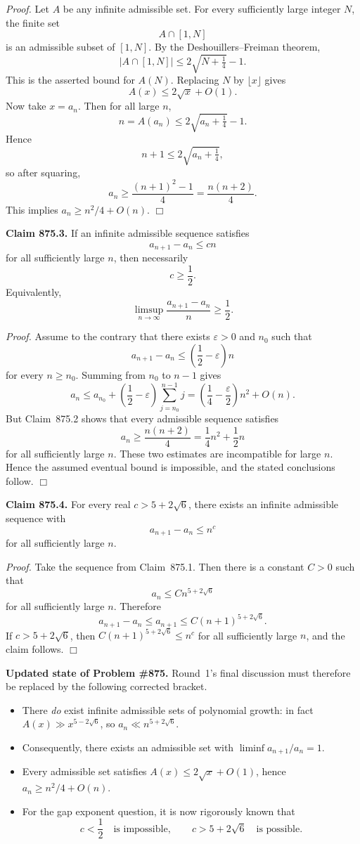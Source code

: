 \medskip
\noindent\emph{Proof.}
Let \(A\) be any infinite admissible set. For every sufficiently large integer \(N\), the finite set
\[
  A\cap [1,N]
\]
is an admissible subset of \([1,N]\). By the Deshouillers--Freiman theorem,
\[
  |A\cap [1,N]| \le 2\sqrt{N+\tfrac14}-1.
\]
This is the asserted bound for \(A(N)\). Replacing \(N\) by \(\lfloor x\rfloor\) gives
\[
  A(x) \le 2\sqrt x + O(1).
\]
Now take \(x=a_n\). Then for all large \(n\),
\[
  n = A(a_n) \le 2\sqrt{a_n+\tfrac14}-1.
\]
Hence
\[
  n+1 \le 2\sqrt{a_n+\tfrac14},
\]
so after squaring,
\[
  a_n \ge \frac{(n+1)^2-1}{4} = \frac{n(n+2)}{4}.
\]
This implies \(a_n\ge n^2/4 + O(n)\).
\hfill\(\Box\)

\medskip
\noindent\textbf{Claim 875.3.} If an infinite admissible sequence satisfies
\[
  a_{n+1}-a_n \le c n
\]
for all sufficiently large \(n\), then necessarily
\[
  c\ge \frac12.
\]
Equivalently,
\[
  \limsup_{n\to\infty}\frac{a_{n+1}-a_n}{n} \ge \frac12.
\]

\medskip
\noindent\emph{Proof.}
Assume to the contrary that there exists \(\varepsilon>0\) and \(n_0\) such that
\[
  a_{n+1}-a_n \le \left(\frac12-\varepsilon\right)n
\]
for every \(n\ge n_0\). Summing from \(n_0\) to \(n-1\) gives
\[
  a_n \le a_{n_0} + \left(\frac12-\varepsilon\right)\sum_{j=n_0}^{n-1} j
  = \left(\frac14-\frac{\varepsilon}{2}\right)n^2 + O(n).
\]
But Claim~875.2 shows that every admissible sequence satisfies
\[
  a_n \ge \frac{n(n+2)}{4} = \frac14 n^2 + \frac12 n
\]
for all sufficiently large \(n\). These two estimates are incompatible for large \(n\). Hence the assumed eventual bound is impossible, and the stated conclusions follow.
\hfill\(\Box\)

\medskip
\noindent\textbf{Claim 875.4.} For every real \(c>5+2\sqrt6\), there exists an infinite admissible sequence with
\[
  a_{n+1}-a_n \le n^c
\]
for all sufficiently large \(n\).

\medskip
\noindent\emph{Proof.}
Take the sequence from Claim~875.1. Then there is a constant \(C>0\) such that
\[
  a_n \le C n^{5+2\sqrt6}
\]
for all sufficiently large \(n\). Therefore
\[
  a_{n+1}-a_n \le a_{n+1} \le C(n+1)^{5+2\sqrt6}.
\]
If \(c>5+2\sqrt6\), then \(C(n+1)^{5+2\sqrt6} \le n^c\) for all sufficiently large \(n\), and the claim follows.
\hfill\(\Box\)

\medskip
\noindent\textbf{Updated state of Problem \#875.}
Round~1's final discussion must therefore be replaced by the following corrected bracket.

\begin{itemize}
\item There \emph{do} exist infinite admissible sets of polynomial growth: in fact \(A(x)\gg x^{5-2\sqrt6}\), so \(a_n\ll n^{5+2\sqrt6}\).
\item Consequently, there exists an admissible set with \(\liminf a_{n+1}/a_n = 1\).
\item Every admissible set satisfies \(A(x)\le 2\sqrt x + O(1)\), hence \(a_n\ge n^2/4 + O(n)\).
\item For the gap exponent question, it is now rigorously known that
\[
  c<\frac12 \quad \text{is impossible},
  \qquad
  c>5+2\sqrt6 \quad \text{is possible}.
\]
\end{itemize}

